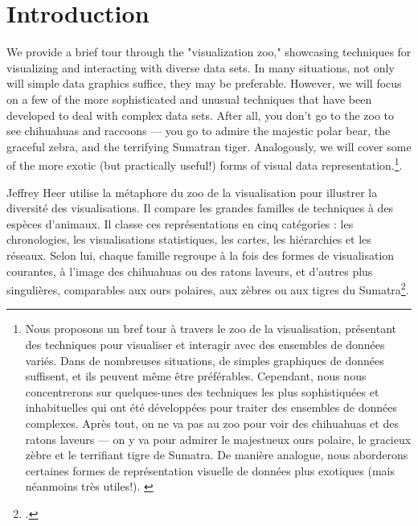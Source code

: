 \documentclass[a4paper,12pt,twoside]{book}
\newcommand\chapterNo[1]{
	\chapter*{#1}
	\markright{\MakeUppercase{#1}}
}
\begin{document}
	\chapterNo{Introduction}
	\begin{displayquote}
	We provide a brief tour through the "visualization zoo," showcasing techniques for visualizing and interacting with diverse data sets. In many situations, not only will simple data graphics suffice, they may be preferable. However, we will focus on a few of the more sophisticated and unusual techniques that have been developed to deal with complex data sets. After all, you don't go to the zoo to see chihuahuas and raccoons — you go to admire the majestic polar bear, the graceful zebra, and the terrifying Sumatran tiger. Analogously, we will cover some of the more exotic (but practically useful!) forms of visual data representation.\footnote{\og Nous proposons un bref tour à travers le \og zoo de la visualisation\fg, présentant des techniques pour visualiser et interagir avec des ensembles de données variés. Dans de nombreuses situations, de simples graphiques de données suffisent, et ils peuvent même être préférables. Cependant, nous nous concentrerons sur quelques-unes des techniques les plus sophistiquées et inhabituelles qui ont été développées pour traiter des ensembles de données complexes. Après tout, on ne va pas au zoo pour voir des chihuahuas et des ratons laveurs — on y va pour admirer le majestueux ours polaire, le gracieux zèbre et le terrifiant tigre de Sumatra. De manière analogue, nous aborderons certaines formes de représentation visuelle de données plus exotiques (mais néanmoins très utiles!)\fg. \cite{heerTourVisualizationZoo}}. 
	\end{displayquote}
	\vspace{0.5cm}
	
	Jeffrey Heer utilise la métaphore du \og zoo de la visualisation \fg pour illustrer la diversité des visualisations. Il compare les grandes familles de techniques à des espèces d'animaux. Il classe ces représentations en cinq catégories : les chronologies, les visualisations statistiques, les cartes, les hiérarchies et les réseaux. Selon lui, chaque famille regroupe à la fois des formes de visualisation courantes, à l'image des chihuahuas ou des ratons laveurs, et d'autres plus singulières, comparables aux ours polaires, aux zèbres ou aux tigres du Sumatra\footcite{heerTourVisualizationZoo}.\\
	
\end{document}
